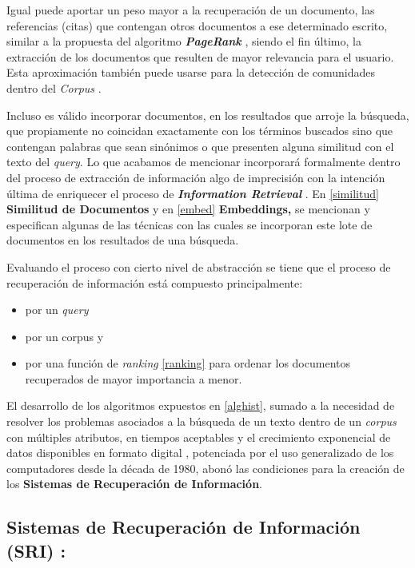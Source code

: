 \documentclass[
  12pt,
  openany]{book}
\begin{document}
Igual puede aportar un peso mayor a la recuperación de un documento, las referencias (citas) que contengan otros documentos a ese determinado escrito, similar a la propuesta del algoritmo \textbf{\emph{PageRank}} \citep{brin1998}, siendo el fin último, la extracción de los documentos que resulten de mayor relevancia para el usuario. Esta aproximación también puede usarse para la detección de comunidades dentro del \emph{Corpus} \citep{heydari2020analysis}.

Incluso es válido incorporar documentos, en los resultados que arroje la búsqueda, que propiamente no coincidan exactamente con los términos buscados sino que contengan palabras que sean sinónimos o que presenten alguna similitud con el texto del \emph{query}. Lo que acabamos de mencionar incorporará formalmente dentro del proceso de extracción de información algo de imprecisión con la intención última de enriquecer el proceso de \textbf{\emph{Information Retrieval}} \citep{kraft2017}. En \ref{similitud} \textbf{Similitud de Documentos} y en \ref{embed} \textbf{Embeddings,} se mencionan y especifican algunas de las técnicas con las cuales se incorporan este lote de documentos en los resultados de una búsqueda.

Evaluando el proceso con cierto nivel de abstracción se tiene que el proceso de recuperación de información está compuesto principalmente:

\begin{itemize}
\item
  por un \emph{query}
\item
  por un corpus y
\item
  por una función de \emph{ranking} \ref{ranking} para ordenar los documentos recuperados de mayor importancia a menor.
\end{itemize}

El desarrollo de los algoritmos expuestos en \ref{alghist}, sumado a la necesidad de resolver los problemas asociados a la búsqueda de un texto dentro de un \emph{corpus} con múltiples atributos, en tiempos aceptables y el crecimiento exponencial de datos disponibles en formato digital \citep{worldde2016}, potenciada por el uso generalizado de los computadores desde la década de 1980, abonó las condiciones para la creación de los \textbf{Sistemas de Recuperación de Información}.

\hypertarget{SRI}{%
\subsection{Sistemas de Recuperación de Información (SRI) :}\label{SRI}}
\end{document}
